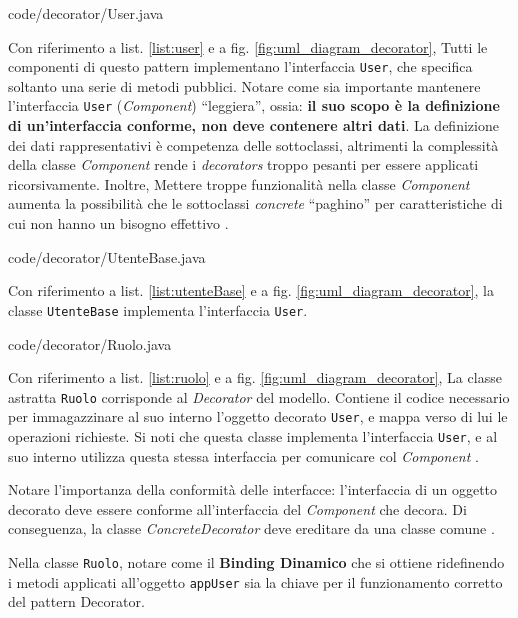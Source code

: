 \documentclass[12pt]{article}
\begin{document}

{code/decorator/User.java}

Con riferimento a list. \ref{list:user} e a fig. \ref{fig:uml_diagram_decorator}, Tutti le componenti di questo pattern implementano l’interfaccia
{\tt User}, che specifica soltanto una serie di metodi pubblici.
Notare come sia importante mantenere l'interfaccia {\tt User} ({\em Component}) ``leggiera'', ossia: \textbf{il suo scopo è la definizione di un'interfaccia conforme, non deve contenere altri dati}. La definizione dei dati rappresentativi è competenza delle sottoclassi, altrimenti la complessità della classe {\em Component} rende i {\em decorators} troppo pesanti per essere applicati ricorsivamente. Inoltre, Mettere troppe funzionalità nella classe {\em Component} aumenta la possibilità che le sottoclassi {\em concrete} ``paghino'' per caratteristiche di cui non hanno un bisogno effettivo \cite{gof_riferimento}.


{code/decorator/UtenteBase.java}

Con riferimento a list. \ref{list:utenteBase} e a fig. \ref{fig:uml_diagram_decorator}, la classe {\tt UtenteBase} implementa l'interfaccia {\tt User}.


{code/decorator/Ruolo.java}

Con riferimento a list. \ref{list:ruolo} e a fig. \ref{fig:uml_diagram_decorator}, 
La classe astratta {\tt Ruolo} corrisponde al {\em Decorator} del
modello. Contiene il codice necessario per immagazzinare al suo interno
l’oggetto decorato {\tt User}, e mappa verso di lui le operazioni richieste. Si noti che questa classe implementa l’interfaccia {\tt User}, e al suo interno utilizza questa stessa interfaccia per comunicare col {\em Component} \cite{gof_sunt}.

Notare l'importanza della conformità delle interfacce: l'interfaccia di un oggetto decorato deve essere conforme all'interfaccia del {\em Component} che decora. Di conseguenza, la classe {\em ConcreteDecorator} deve ereditare da una classe comune \cite{gof_riferimento}.

Nella classe {\tt Ruolo}, notare come il \textbf{Binding Dinamico} che si ottiene ridefinendo i metodi applicati all'oggetto {\tt appUser} sia la chiave per il funzionamento corretto del pattern Decorator.
\end{document}
